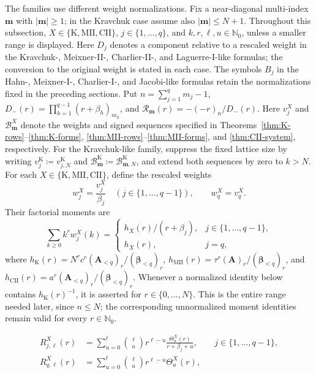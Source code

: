 \documentclass[10pt,a4paper]{amsart}
\newcommand{\A}{\boldsymbol A}
\newcommand{\Nzero}{\mathbb N_0}
\newcommand{\abs}[1]{\lvert#1\rvert}
\newcommand{\bbeta}{\boldsymbol\beta}
\newcommand{\fall}[2]{#1^{\underline{#2}}}
\newcommand{\mm}{\boldsymbol m}
\begin{document}
The families use different weight normalizations. Fix a near-diagonal
multi-index \(\mm\) with \(\abs\mm\ge1\); in the Kravchuk case assume
also \(\abs\mm\le N+1\). Throughout this subsection,
\(X\in\{\mathrm K,\mathrm{MII},\mathrm{CII}\}\),
\(j\in\{1,\ldots,q\}\), and \(k,r,\ell,u\in\Nzero\), unless a smaller
range is displayed. Here
\(D_j\) denotes a component relative to a rescaled weight in the
Kravchuk-, Meixner-II-, Charlier-II-, and Laguerre-I-like formulas; the
conversion to the original weight is stated in each case. The symbols
\(B_j\) in the Hahn-, Meixner-I-, Charlier-I-, and Jacobi-like formulas
retain the normalizations fixed in the preceding sections. Put
\(n=\sum_{j=1}^q m_j-1\),
\(D_-(r)=\prod_{h=1}^{q-1}(r+\beta_h)_{m_h}\), and
\(\mathcal R_{\mm}(r)=-(-r)_n/D_-(r)\).
Here \(v_j^X\) and \(\mathcal B_{\mm}^X\) denote the weights and signed
sequences specified in Theorems~\ref{thm:K-rows}--\ref{thm:K-forms},
\ref{thm:MII-rows}--\ref{thm:MII-forms}, and
\ref{thm:CII-system}, respectively. For the
Kravchuk-like family, suppress the fixed lattice size by writing
\(v_j^{\mathrm K}\coloneq v_{j,N}^{\mathrm K}\) and
\(\mathcal B_{\mm}^{\mathrm K}\coloneq\mathcal B_{\mm,N}^{\mathrm K}\), and
extend both sequences by zero to \(k>N\).
For each \(X\in\{\mathrm K,\mathrm{MII},\mathrm{CII}\}\), define the
rescaled weights
\begin{equation}
 w_j^X=\frac{v_j^X}{\beta_j}\quad
 (j\in\{1,\ldots,q-1\}),
 \qquad w_q^X=v_q^X.
 \label{eq:unreflected-canonical-rows}
\end{equation}
Their factorial moments are
\begin{equation}
 \sum_{k\ge0}\fall{k}{r}w_j^X(k)=
 \begin{cases}
 h_X(r)/(r+\beta_j),&j\in\{1,\ldots,q-1\},\\
 h_X(r),&j=q,
 \end{cases}
 \label{eq:unreflected-canonical-moments}
\end{equation}
where
\(h_{\mathrm K}(r)=\fall{N}{r}c^r(\A_{<q})_r/(\bbeta_{<q})_r\),
\(h_{\mathrm{MII}}(r)=\tau^r(\A)_r/(\bbeta_{<q})_r\), and
\(h_{\mathrm{CII}}(r)=a^r(\A_{<q})_r/(\bbeta_{<q})_r\).
Whenever a normalized identity below contains \(h_{\mathrm K}(r)^{-1}\),
it is asserted for \(r\in\{0,\ldots,N\}\). This is the entire range needed
later, since \(n\le N\); the corresponding unnormalized moment identities
remain valid for every \(r\in\Nzero\).

\begin{align}
 R_{j,\ell}^X(r)
 &=\sum_{u=0}^{\ell}\binom\ell u\fall{r}{\ell-u}
   \frac{\Theta_u^X(r)}{r+\beta_j+u},&&
   j\in\{1,\ldots,q-1\},
 \label{eq:unreflected-R-finite-row}\\
 R_{q,\ell}^X(r)
 &=\sum_{u=0}^{\ell}\binom\ell u\fall{r}{\ell-u}
   \Theta_u^X(r),
 \label{eq:unreflected-R-base-row}
\end{align}
\end{document}

